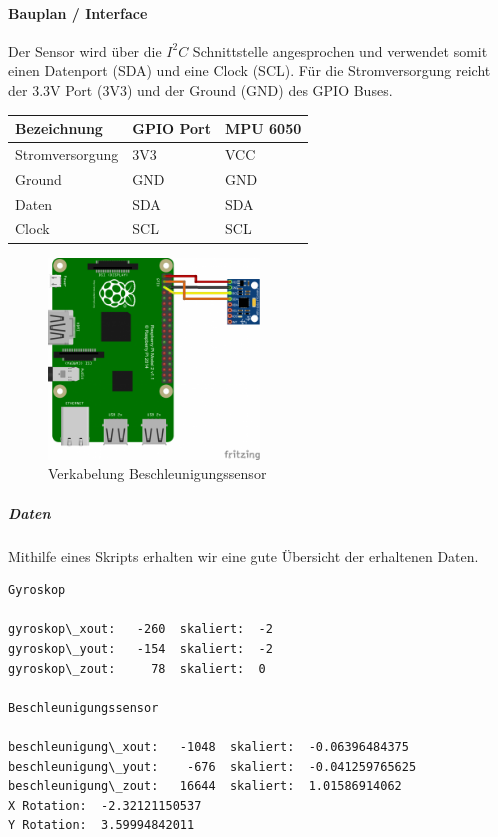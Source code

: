\documentclass[../../main.tex]{subfiles}
\begin{document}
\paragraph{Bauplan / Interface}
Der Sensor wird über die $I^2C$ Schnittstelle angesprochen und verwendet somit einen Datenport (SDA) und eine Clock (SCL). Für die Stromversorgung reicht der 3.3V Port (3V3) und der Ground (GND) des GPIO Buses.

\begin{table}[H]
\begin{flushleft}
\begin{tabular}{lll}
Bezeichnung     & GPIO Port & MPU 6050 \\ \hline
Stromversorgung & 3V3      & VCC      \\ \hline
Ground          & GND      & GND      \\ \hline
Daten          & SDA      & SDA       \\ \hline
Clock          & SCL      & SCL       \\ \hline
\end{tabular}
\end{flushleft}
\end{table}

\begin{figure}[H] \centering
  \includegraphics[width=0.5\textwidth, angle=90]{Verkabelung_BeschlSensor}
  \caption{Verkabelung Beschleunigungssensor}
  \label{fig:Beschleunigungssensor}
\end{figure}

\subparagraph{Daten}
Mithilfe eines Skripts erhalten wir eine gute Übersicht der erhaltenen Daten.

\begin{lstlisting}
Gyroskop

gyroskop\_xout:   -260  skaliert:  -2
gyroskop\_yout:   -154  skaliert:  -2
gyroskop\_zout:     78  skaliert:  0

Beschleunigungssensor

beschleunigung\_xout:   -1048  skaliert:  -0.06396484375
beschleunigung\_yout:    -676  skaliert:  -0.041259765625
beschleunigung\_zout:   16644  skaliert:  1.01586914062
X Rotation:  -2.32121150537
Y Rotation:  3.59994842011
\end{lstlisting}
\end{document}
